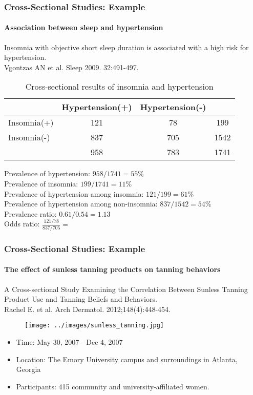 \documentclass[table,10pt]{beamer}
\begin{document}
\begin{CJK*}{UTF8}{gbsn}
\begin{frame}[t]
\frametitle{Cross-Sectional Studies: Example}
\framesubtitle{Association between sleep and hypertension}
{\large \alert{Insomnia with objective short sleep duration is associated 
with a high risk for hypertension.}}\\
\small{Vgontzas AN et al. Sleep 2009. 32:491-497.}
\begin{table}
\renewcommand\arraystretch{1.2}
\caption{Cross-sectional results of insomnia and hypertension}
\begin{tabular}{lccc}
\hline
 & Hypertension(+) & Hypertension(-) & \\
\hline
Insomnia(+) & 121 & 78 & 199\\
Insomnia(-) & 837 & 705 & 1542\\
\hline
 & 958 & 783 & 1741
\end{tabular}
\end{table}
Prevalence of hypertension: $958/1741 = 55\%$\\
Prevalence of insomnia: $199/1741 = 11\%$\\
Prevalence of hypertension among insomnia: $121/199 = 61\%$\\
Prevalence of hypertension among non-insomnia: $837/1542 = 54\%$\\
Prevalence ratio: $0.61/0.54 = 1.13$\\
Odds ratio: $\frac{121/78}{837/705} = $
\end{frame}

\begin{frame}[t]
\frametitle{Cross-Sectional Studies: Example}
\framesubtitle{The effect of sunless tanning products on tanning behaviors}
{\large \alert{A Cross-sectional Study Examining the Correlation Between 
Sunless Tanning Product Use and Tanning Beliefs and Behaviors.}}\\
\small{Rachel E. et al. Arch Dermatol. 2012;148(4):448-454.}
\begin{figure}
\texttt{[image: ../images/sunless\_tanning.jpg]}
\end{figure}
\begin{itemize}
	\item Time: May 30, 2007 - Dec 4, 2007
	\item Location: The Emory University campus and surroundings in Atlanta, 
		Georgia
	\item Participants: 415 community and university-affiliated women.
\end{itemize}
\end{frame}



\end{CJK*}
\end{document}
